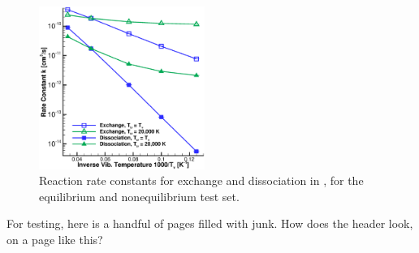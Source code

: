 \begin{figure}[p]
   \centering
   \includegraphics[width=0.48\textwidth]{./figures/N3_Dissoc_vs_Exchange.eps}
   \caption[Exchange and dissociation rates in ]
      {Reaction rate constants for exchange and dissociation in ,
      for the equilibrium and nonequilibrium test set.}
   \label{fig:N3_Exchange_Rate}
\end{figure}

For testing, here is a handful of pages filled with junk.
How does the header look, on a page like this?

\lipsum[1-10]

